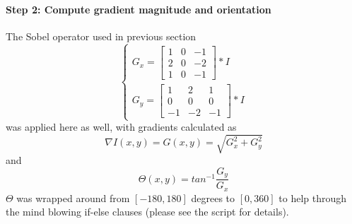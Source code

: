 \documentclass[12pt]{article}
\begin{document}
\paragraph*{Step 2: Compute gradient magnitude and orientation}
The Sobel operator used in previous section
\begin{equation}
\begin{cases}
	G_x = \begin{bmatrix}
		1 & 0 & -1 \\ 2 & 0 & -2 \\ 1 & 0 & -1 
	\end{bmatrix} \ast I \\
	G_y = \begin{bmatrix}
		1 & 2 & 1 \\ 0 & 0 & 0 \\ -1 & -2 & -1
	\end{bmatrix} \ast I
\end{cases}
\end{equation}
was applied here as well, with gradients calculated as
\begin{equation}
	\nabla I(x, y) = G(x, y) = \sqrt{G_x^2 + G_y^2}
\end{equation}
and
\begin{equation}
	\Theta(x, y) = tan^{-1}\frac{G_y}{G_x}
\end{equation}
$\Theta$ was wrapped around from $[-180, 180]$ degrees to $[0, 360]$ to help through the mind blowing if-else clauses (please see the script for details).
\end{document}
